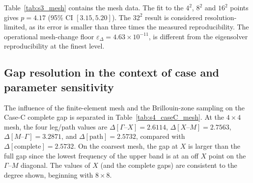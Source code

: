 \begin{table}[htbp]
\centering
\caption{Detailed convergence information for expanded mesh: successive changes, eigensolver reproducibility.}
\label{tab:s3_mesh}

\end{table}

Table~\ref{tab:s3_mesh} contains the mesh data. The fit to the $4^2$, $8^2$ and $16^2$ points gives $p=4.17$ (95\% CI $[3.15,5.20]$). The $32^2$ result is considered resolution-limited, as its error is smaller than three times the measured reproducibility. The operational mesh-change floor $\varepsilon_\Delta=4.63\times10^{-11}$, is different from the eigensolver reproducibility at the finest level.
\subsection{Gap resolution in the context of case and parameter sensitivity}
\label{app:caseC_resolution}
The influence of the finite-element mesh and the Brillouin-zone sampling on the Case-C complete gap is separated in Table~\ref{tab:s4_caseC_mesh}. At the $4\times4$ mesh, the four leg/path values are $\Delta[\Gamma\text{--}X]=2.6114$, $\Delta[X\text{--}M]=2.7563$, $\Delta[M\text{--}\Gamma]=3.2871$, and $\Delta[\mathrm{path}]=2.5732$, compared with $\Delta[\mathrm{complete}]=2.5732$. On the coarsest mesh, the gap at $X$ is larger than the full gap since the lowest frequency of the upper band is at an off $X$ point on the $\Gamma$--$M$ diagonal. The values of $X$ (and the complete gaps) are consistent to the degree shown, beginning with $8\times8$.

\begin{table}[htbp]
\centering
\caption{Case-C: Complete Gap and $X$-point Gap values with mesh refinement.}
\label{tab:s4_caseC_mesh}

\end{table}

